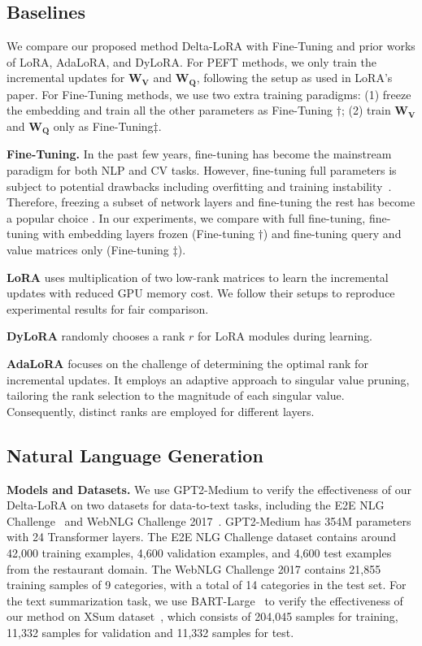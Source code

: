 {\subsection{Baselines}
We compare our proposed method Delta-LoRA with Fine-Tuning and prior works of LoRA, AdaLoRA, and DyLoRA. For PEFT methods, we only train the incremental updates for $\boldsymbol{W}_{\boldsymbol{V}}$ and $\boldsymbol{W}_{\boldsymbol{Q}}$, following the setup as used in LoRA's paper. For Fine-Tuning methods, we use two extra training paradigms: (1) freeze the embedding and train all the other parameters as Fine-Tuning $\dag$; (2) train $\boldsymbol{W}_{\boldsymbol{V}}$ and $\boldsymbol{W}_{\boldsymbol{Q}}$ only as Fine-Tuning$\ddag$.

\textbf{Fine-Tuning.} 
In the past few years, fine-tuning has become the mainstream paradigm for both NLP and CV tasks. However, fine-tuning full parameters is subject to potential drawbacks including overfitting and training instability~\citep{huang-etal-2022-sparse}. Therefore, freezing a subset of network layers and fine-tuning the rest has become a popular choice \citep{tan2018survey}. In our experiments, we compare with full fine-tuning, fine-tuning with embedding layers frozen (Fine-tuning $\dag$) and fine-tuning query and value matrices only (Fine-tuning $\ddag$). 

\textbf{LoRA} \citep{lora_hu2022lora} uses multiplication of two low-rank matrices to learn the incremental updates with reduced GPU memory cost. We follow their setups to reproduce experimental results for fair comparison. 

\textbf{DyLoRA} \citep{dylora_valipour2023dylora} randomly chooses a rank $r$ for LoRA modules during learning. 

\textbf{AdaLoRA} \citep{adalora_zhang2022adaptive} focuses on the challenge of determining the optimal rank for incremental updates. It employs an adaptive approach to singular value pruning, tailoring the rank selection to the magnitude of each singular value. Consequently, distinct ranks are employed for different layers.

\subsection{Natural Language Generation}
\textbf{Models and Datasets.} We use GPT2-Medium to verify the effectiveness of our Delta-LoRA  on two datasets for data-to-text tasks, including the E2E NLG Challenge~\citep{puzikov-gurevych-2018-e2e} and WebNLG Challenge 2017~\citep{gardent-etal-2017-webnlg}. GPT2-Medium has 354M parameters with 24 Transformer layers. The E2E NLG Challenge dataset contains around 42,000 training examples, 4,600 validation examples, and 4,600 test examples from the restaurant domain. The WebNLG Challenge 2017 contains 21,855 training samples of 9 categories, with a total of 14 categories in the test set. For the text summarization task, we use BART-Large~\citep{bart_lewis2019bart} to verify the effectiveness of our method on XSum dataset~\citep{xsum_narayan2018don}, which consists of 204,045 samples for training, 11,332 samples for validation and 11,332 samples for test. 

}
